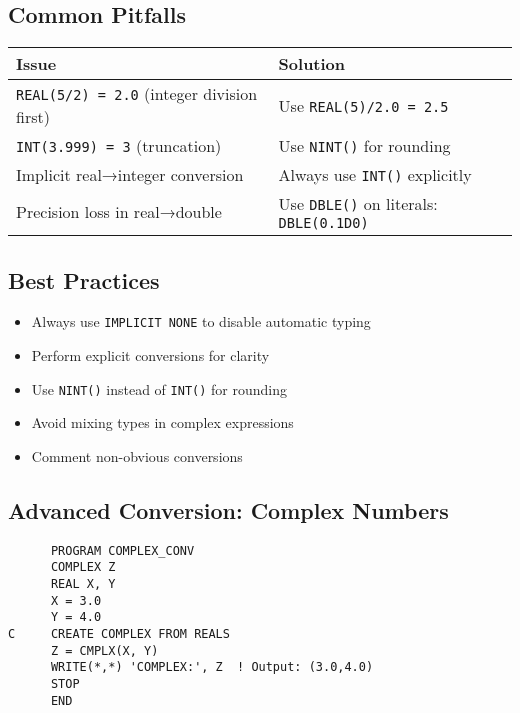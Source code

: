 \documentclass{book}
\begin{document}
\subsection*{Common Pitfalls}
\begin{center}
\begin{tabular}{|p{4cm}|p{8cm}|}
\hline
\textbf{Issue} & \textbf{Solution} \\ 
\hline
\texttt{REAL(5/2) = 2.0} (integer division first) & Use \texttt{REAL(5)/2.0 = 2.5} \\
\hline
\texttt{INT(3.999) = 3} (truncation) & Use \texttt{NINT()} for rounding \\
\hline
Implicit real→integer conversion & Always use \texttt{INT()} explicitly \\
\hline
Precision loss in real→double & Use \texttt{DBLE()} on literals: \texttt{DBLE(0.1D0)} \\
\hline
\end{tabular}
\end{center}

\subsection*{Best Practices}
\begin{itemize}
    \item Always use \texttt{IMPLICIT NONE} to disable automatic typing
    \item Perform explicit conversions for clarity
    \item Use \texttt{NINT()} instead of \texttt{INT()} for rounding
    \item Avoid mixing types in complex expressions
    \item Comment non-obvious conversions
\end{itemize}

\subsection*{Advanced Conversion: Complex Numbers}
\begin{verbatim}
      PROGRAM COMPLEX_CONV
      COMPLEX Z
      REAL X, Y
      X = 3.0
      Y = 4.0
C     CREATE COMPLEX FROM REALS
      Z = CMPLX(X, Y)
      WRITE(*,*) 'COMPLEX:', Z  ! Output: (3.0,4.0)
      STOP
      END
\end{verbatim}
\end{document}
